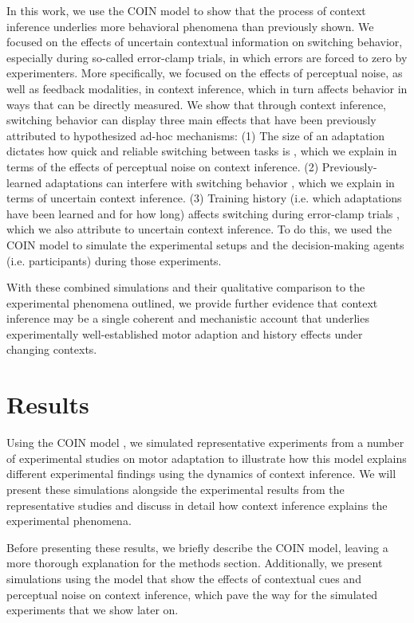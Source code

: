 \documentclass[a4paper,doc,floatsintext,natbib]{apa6}
\begin{document}
In this work, we use the COIN model to show that the process of context inference underlies more behavioral phenomena than previously shown. We focused on the effects of uncertain contextual information on switching behavior, especially during so-called error-clamp trials, in which errors are forced to zero by experimenters. More specifically, we focused on the effects of perceptual noise, as well as feedback modalities, in context inference, which in turn affects behavior in ways that can be directly measured. We show that through context inference, switching behavior can display three main effects that have been previously attributed to hypothesized ad-hoc mechanisms: (1) The size of an adaptation dictates how quick and reliable switching between tasks is \cite{Oh_Minimizing_2019,Kim_Neural_2015}, which we explain in terms of the effects of perceptual noise on context inference. (2) Previously-learned adaptations can interfere with switching behavior \citep{Davidson_Scaling_2004}, which we explain in terms of uncertain context inference. (3) Training history (i.e. which adaptations have been learned and for how long) affects switching during error-clamp trials \citep{Vaswani_Decay_2013}, which we also attribute to uncertain context inference. To do this, we used the COIN model to simulate the experimental setups and the decision-making agents (i.e. participants) during those experiments.

With these combined simulations and their qualitative comparison to the experimental phenomena outlined, we provide further evidence that context inference may be a single coherent and mechanistic account that underlies experimentally well-established motor adaption and history effects under changing contexts.

\section{Results}
Using the COIN model \citep{Heald_Contextual_2021}, we simulated representative experiments from a number of experimental studies on motor adaptation to illustrate how this model explains different experimental findings using the dynamics of context inference. We will present these simulations alongside the experimental results from the representative studies and discuss in detail how context inference explains the experimental phenomena.

Before presenting these results, we briefly describe the COIN model, leaving a more thorough explanation for the methods section. Additionally, we present simulations using the model that show the effects of contextual cues and perceptual noise on context inference, which pave the way for the simulated experiments that we show later on.
\end{document}

